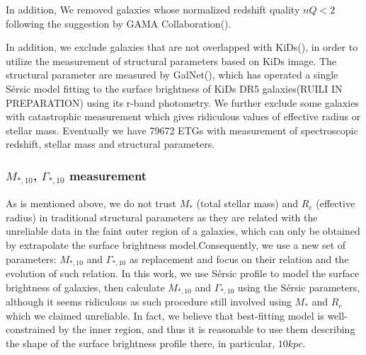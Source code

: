 \documentclass[fleqn,usenatbib]{mnras}
\begin{document}
 In addition, We removed galaxies whose normalized redshift quality $nQ < 2$ following the suggestion by GAMA Collaboration(\citep{GAMAmain}).
\par In addition, we exclude galaxies that are not overlapped with KiDs(\cite{kuijken_fourth_2019}), in order to utilize the measurement of structural parameters based on KiDs image. 
The structural parameter are measured by GalNet(\cite{GaLNet2022}), which has operated a single S\'{e}rsic model fitting to the surface brightness of  KiDs DR5 galaxies(RUILI IN PREPARATION) using its r-band photometry.
 We further exclude some galaxies with catastrophic measurement which gives ridiculous values of effective radius or stellar mass. Eventually we have 79672 ETGs with measurement of spectroscopic redshift, stellar mass and structural parameters.  
\subsubsection{$M_{*,10}$, $\Gamma_{*,10}$ measurement}
As is mentioned above, we do not trust $M_*$ (total stellar mass) and $R_e$ (effective radius) in traditional structural parameters as they are related with the unreliable data in the faint outer region of a galaxies, which can only be obtained by extrapolate the surface brightness model.Consequently, we use a new set of parameters: $M_{*,10}$ and $\Gamma_{*,10}$ as replacement and focus on their relation and the evolution of such relation. In this work, we use S\'{e}rsic profile to model the surface brightness of galaxies, then calculate $M_{*,10}$ and $\Gamma_{*,10}$ using the S\'{e}rsic parameters, although it seems ridiculous as such procedure still involved using $M_*$ and $R_e$ which we claimed unreliable. In fact, we believe that best-fitting model is well-constrained by the inner region, and thus it is reasonable to use them describing the shape of the surface brightness profile there, in particular, $10kpc$.
\end{document}
